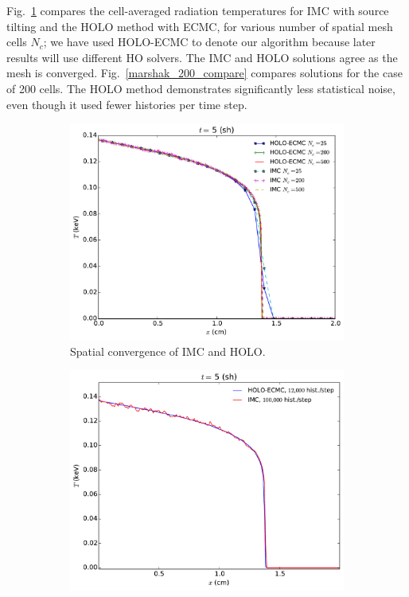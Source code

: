 \documentclass[11pt]{article}
\begin{document}
Fig.~\ref{marshak_mesh_conv} compares the cell-averaged radiation temperatures  for
IMC with source tilting and the HOLO method with ECMC, for various number of spatial mesh cells $N_c$; we
have used HOLO-ECMC to denote our algorithm because later results will use different
HO solvers.  The IMC and HOLO solutions agree as the mesh is converged.  
Fig.~\ref{marshak_200_compare} compares solutions
for the case of 200 cells.  The HOLO method demonstrates significantly less
statistical noise, even though it used fewer histories per time step.
\begin{figure}[H]
    \centering
\begin{subfigure}{0.49\textwidth}
  \centering
    \includegraphics[width=0.99\linewidth]{marshak_mesh_conv.pdf}
    \caption{\label{marshak_mesh_conv} Spatial convergence of IMC and HOLO.}
\end{subfigure}
\begin{subfigure}{0.49\textwidth}
    \vspace{0.021in}
  \centering
  \includegraphics[width=0.99\linewidth]{marshak_200_compare.pdf}

\end{subfigure}
\end{figure}
\end{document}
